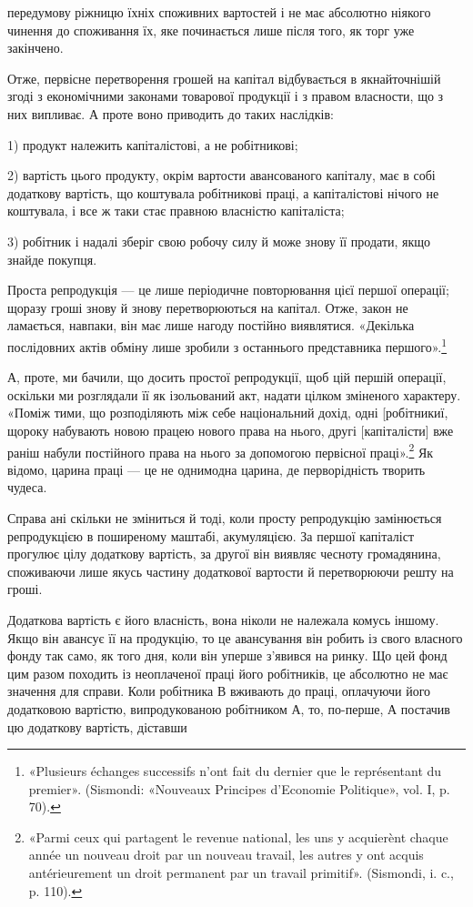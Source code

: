 \parcont{}  %
передумову ріжницю їхніх споживних вартостей і не має абсолютно
ніякого чинення до споживання їх, яке починається лише
після того, як торг уже закінчено.

Отже, первісне перетворення грошей на капітал відбувається
в якнайточнішій згоді з економічними законами товарової продукції
і з правом власности, що з них випливає. А проте воно
приводить до таких наслідків:

1) продукт належить капіталістові, а не робітникові;

2) вартість цього продукту, окрім вартости авансованого капіталу,
має в собі додаткову вартість, що коштувала робітникові
праці, а капіталістові нічого не коштувала, і все ж таки стає
правною власністю капіталіста;

3) робітник і надалі зберіг свою робочу силу й може знову її
продати, якщо знайде покупця.

Проста репродукція — це лише періодичне повторювання
цієї першої операції; щоразу гроші знову й знову перетворюються
на капітал. Отже, закон не ламається, навпаки, він
має лише нагоду постійно виявлятися. «Декілька послідовних
актів обміну лише зробили з останнього представника першого».\footnote*{
«Plusieurs échanges successifs n’ont fait du dernier que le représentant
du premier». (Sismondi: «Nouveaux Principes d’Economie Politique»,
vol. I, p. 70).
}

А, проте, ми бачили, що досить простої репродукції, щоб цій
першій операції, оскільки ми розглядали її як ізольований акт,
надати цілком зміненого характеру. «Поміж тими, що розподіляють
між себе національний дохід, одні [робітникиї, щороку
набувають новою працею нового права на нього, другі [капіталісти]
вже раніш набули постійного права на нього за допомогою
первісної праці».\footnote*{
«Parmi ceux qui partagent le revenue national, les uns y acquierènt
chaque année un nouveau droit par un nouveau travail, les autres y ont acquis
antérieurement un droit permanent par un travail primitif». (Sismondi,
i. c., p. 110).
} Як відомо, царина праці — це не однимодна
царина, де перворідність творить чудеса.

Справа ані скільки не зміниться й тоді, коли просту репродукцію
замінюється репродукцією в поширеному маштабі, акумуляцією.
За першої капіталіст прогулює цілу додаткову вартість,
за другої він виявляє чесноту громадянина, споживаючи
лише якусь частину додаткової вартости й перетворюючи решту
на гроші.

Додаткова вартість є його власність, вона ніколи не належала
комусь іншому. Якщо він авансує її на продукцію, то це авансування
він робить із свого власного фонду так само, як того
дня, коли він уперше з’явився на ринку. Що цей фонд цим разом
походить із неоплаченої праці його робітників, це абсолютно не
має значення для справи. Коли робітника В вживають до праці,
оплачуючи його додатковою вартістю, випродукованою робітником
А, то, по-перше, А постачив цю додаткову вартість, діставши
\parbreak{}  %
